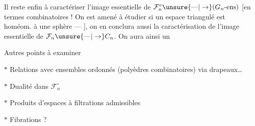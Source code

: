Il reste enfin à caractériser l'image essentielle de $\mathcal F_n^\circ\unsure{\text{---}|\to}(G_n\text{-ens})$ [en termes combinatoires !
On est amené à étudier si un espace triangulé est homéom. à une sphère ---   ],
on en conclura aussi la caractérisation de l'image essentielle de $\mathcal F_n\unsure{\text{---}|\to}C_n$. On aura ainsi un 

Autres points à examiner\par
$\ast$ Relations avec ensembles ordonnés (polyèdres combinatoires) via drapeaux\ldots\par
$\ast$ Dualité dans $\mathcal F_n^\circ$\par
$\ast$ Produits d'espaces à filtrations admissibles\par
$\ast$ Fibrations ?
